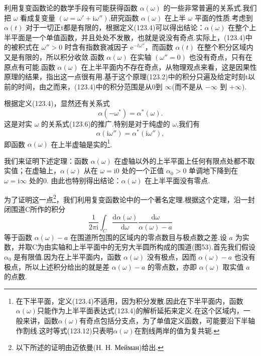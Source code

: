 利用复变函数论的数学手段有可能获得函数 $\alpha(\omega)$ 的一些非常普遍的关系式.我们把 $\omega$ 看成复变量 $(\omega=\omega'+\mathrm{i}\omega'')$,研究函数 $\alpha(\omega)$ 在上半 $\omega$ 平面的性质.考虑到 $\alpha(t)$ 对于一切正t都是有限的，根据定义(123.4)可以得出结论：$\alpha(\omega)$ 在整个上半平面是一个单值函数，并且处处不发散，也就是说没有奇点.实际上，(123.4)中的被积式在 $\omega''>0$ 时含有指数衰减因子 $\mathrm{e}^{-t\omega''}$，而函数 $\alpha(t)$ 在整个积分区域内又是有限的，所以积分收敛.函数 $\alpha(\omega)$ 在实轴 $(\omega''=0)$ 也没有奇点，只有在原点有可能.函数 $\alpha(\omega)$ 在上半平面内不存在奇点，从物理观点来看，这是因果性原理的结果，指出这一点很有用.基于这个原理(123.2)中的积分只遍及给定时刻t以前的时间，由之而来，(123.4)中的积分范围是从0到 $\infty$(而不是从 $-\infty$ 到 $+\infty$).

根据定义(123.4)，显然还有关系式
\begin{equation}
  \alpha(-\omega^*)=\alpha^*(\omega).
\end{equation}
这是对实 $\omega$ 的关系式(123.6)的推广.特别是对于纯虚的 $\omega$,我们有
\begin{equation*}
  \alpha(\mathrm{i}\omega'')=\alpha^*(\mathrm{i}\omega''),
\end{equation*}
即函数 $\alpha(\omega)$ 在上半虚轴是实的\footnote{在下半平面，定义(123.4)不适用，因为积分发散.因此在下半平面内，函数$\alpha(\omega)$只能作为上半平面表达式(123.4)的解析延拓来定义.在这个区域内，一般来讲，函数$\alpha(\omega)$有奇点包括分支点，为了单值定义函数，可能要沿下半轴作割线.这时等式(123.12)只表明$\alpha(\omega)$在割线两岸的值为复共轭.}.

我们来证明下述定理：函数 $\alpha(\omega)$ 在虚轴以外的上半平面上任何有限点处都不取实值；在虚轴上，$\alpha(\omega)$ 从在 $\omega=\mathrm{i}0$ 处的一个正值 $\alpha_0>0$ 单调地下降到在 $\omega=\mathrm{i}\infty$ 处的0. 由此也特别得出结论：$\alpha(\omega)$ 在上半平面没有零点.

为了证明这一点\footnote{以下所述的证明由迈依曼(Н. Н. Мейман)给出.}，我们利用复变函数论中的一个著名定理.根据这个定理，沿一封闭围道C所作的积分
\begin{equation}
  \frac{1}{2\pi\mathrm{i}}\int_C\frac{\mathrm{d}\alpha(\omega)}{\mathrm{d}\omega}
  \frac{\mathrm{d}\omega}{\alpha(\omega)-a}
\end{equation}
等于函数 $\alpha(\omega)-a$ 在围道所包围的区域内的零点数目与极点数之差.设 $a$ 为实数，并取C为由实轴和上半平面中的无穷大半圆所构成的围道(图53).首先我们假设 $\alpha_0$ 是有限值.因为在上半平面内，函数 $\alpha(\omega)$ 没有极点，因而 $\alpha(\omega)-a$ 也没有极点，所以上述积分给出的就是差 $\alpha(\omega)-a$ 的零点数，亦即 $\alpha(\omega)$ 取实值 $a$ 的点数.

